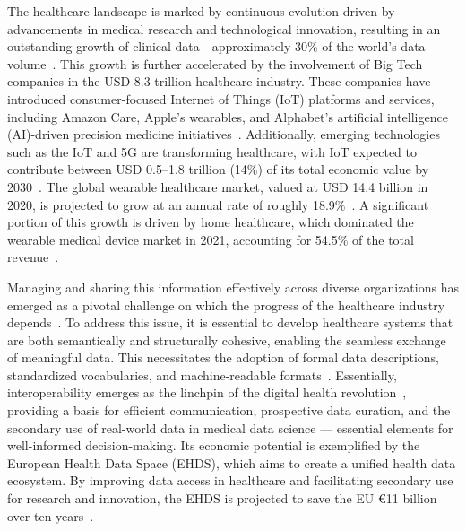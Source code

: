 The healthcare landscape is marked by continuous evolution driven by advancements in medical research and technological innovation, resulting in an outstanding growth of clinical data
- approximately 30\% of the world’s data volume~\cite{thomason_data_2024}. This growth is further accelerated by the involvement of Big Tech companies in the USD 8.3 trillion healthcare industry. These companies have introduced consumer-focused Internet of Things (IoT) platforms and services, including Amazon Care, Apple’s wearables, and Alphabet’s artificial intelligence (AI)-driven precision medicine initiatives~\cite{thomason_data_2024}. Additionally, emerging technologies such as the IoT and 5G are transforming healthcare, with IoT expected to contribute between USD 0.5–1.8 trillion (14\%) of its total economic value by 2030~\cite{seixas-lopes_musculoskeletal_2024}. The global wearable healthcare market, valued at USD 14.4 billion in 2020, is projected to grow at an annual rate of roughly 18.9\%~\cite{thomason_data_2024}. A significant portion of this growth is driven by home healthcare, which dominated the wearable medical device market in 2021, accounting for 54.5\% of the total revenue~\cite{thomason_data_2024}.

Managing and sharing this information effectively across diverse organizations has emerged as a pivotal challenge on which the progress of the healthcare industry depends~\cite{lehne_why_2019,chatterjee_hl7_2022,kadakia_modernizing_2021}. 
To address this issue, it is essential to develop healthcare systems that are both semantically and structurally cohesive, enabling the seamless exchange of meaningful data. This necessitates the adoption of formal data descriptions, standardized vocabularies, and machine-readable formats~\cite{chatterjee_hl7_2022}. Essentially, interoperability emerges as the linchpin of the digital health revolution~\cite{lehne_why_2019,benson_why_2021}, providing a basis for efficient communication, prospective data curation, and the secondary use of real-world data in medical data science — essential elements for well-informed decision-making. Its economic potential is exemplified by the European Health Data Space (EHDS), which aims to create a unified health data ecosystem. By improving data access in healthcare and facilitating secondary use for research and innovation, the EHDS is projected to save the EU €11 billion over ten years~\cite{qeuropean}.

